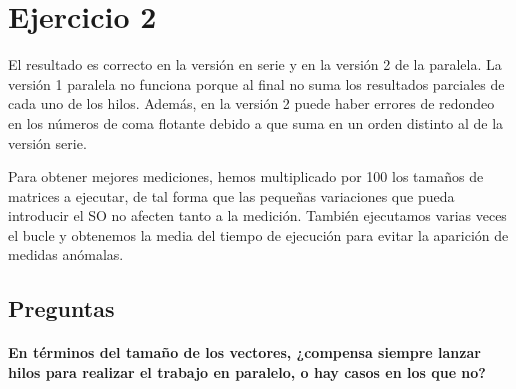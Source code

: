 \documentclass{apuntes}
\begin{document}
\section*{Ejercicio 2}

El resultado es correcto en la versión en serie y en la versión 2 de la paralela. La versión 1 paralela no funciona porque al final no suma los resultados parciales de cada uno de los hilos. Además, en la versión 2 puede haber errores de redondeo en los números de coma flotante debido a que suma en un orden distinto al de la versión serie.



Para obtener mejores mediciones, hemos multiplicado por 100 los tamaños de matrices a ejecutar, de tal forma que las pequeñas variaciones que pueda introducir el SO no afecten tanto a la medición. También ejecutamos varias veces el bucle y obtenemos la media del tiempo de ejecución para evitar la aparición de medidas anómalas.

\subsection*{Preguntas}

\paragraph{En términos del tamaño de los vectores, ¿compensa siempre lanzar hilos para realizar el trabajo en paralelo, o hay casos en los que no?}
\end{document}
